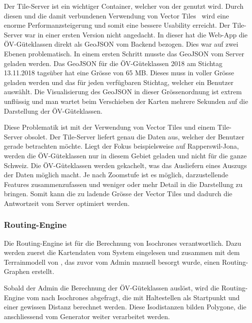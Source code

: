 Der Tile-Server ist ein wichtiger Container, welcher von der  genutzt wird.
Durch diesen und die damit verbundenen Verwendung von Vector Tiles~\cite{geometalab_vectortiles} wird eine enorme Performanzsteigerung und somit eine bessere Usability erreicht.
Der Tile-Server war in einer ersten Version nicht angedacht.
In dieser hat die Web-App die \acs{ÖV}-Güteklassen direkt als GeoJSON vom Backend bezogen.
Dies war auf zwei Ebenen problematisch.
In einem ersten Schritt musste das GeoJSON vom Server geladen werden.
Das GeoJSON für die \acs{ÖV}-Güteklassen 2018 am Stichtag 13.11.2018 tagsüber hat eine Grösse von 65 MB.
Dieses muss in voller Grösse geladen werden und das für jeden verfügbaren Stichtag, welcher ein Benutzer auswählt.
Die Visualisierung des GeoJSON in dieser Grössenordnung ist extrem unflüssig und man wartet beim Verschieben der Karten mehrere Sekunden auf die Darstellung der \acs{ÖV}-Güteklassen.

Diese Problematik ist mit der Verwendung von Vector Tiles und einem Tile-Server obsolet.
Der Tile-Server liefert genau die Daten aus, welcher der Benutzer gerade betrachten möchte.
Liegt der Fokus beispielsweise auf Rapperswil-Jona, werden die \acs{ÖV}-Güteklassen nur in diesem Gebiet geladen und nicht für die ganze Schweiz.
Die \acs{ÖV}-Güteklassen werden gekachelt, was das Ausliefern eines Auszugs der Daten möglich macht.
Je nach Zoomstufe ist es möglich, darzustellende Features zusammenzufassen und weniger oder mehr Detail in die Darstellung zu bringen. Somit kann die zu ladende Grösse der Vector Tiles und dadurch die Antwortzeit vom Server optimiert werden.

\subsubsection{Routing-Engine}
\label{container:Routing-Engine}

Die Routing-Engine ist für die Berechnung von \glspl{Isochrone} verantwortlich.
Dazu werden zuerst die Kartendaten vom System  eingelesen und zusammen mit dem \gls{Terrainmodell} von , das zuvor vom Admin manuell besorgt wurde, einen Routing-Graphen erstellt.

Sobald der Admin die Berechnung der ÖV-Güteklassen auslöst, wird die Routing-Engine vom  nach \glspl{Isochrone} abgefragt, die mit Haltestellen als Startpunkt und einer gewissen Distanz berechnet werden.
Diese Isodistanzen bilden Polygone, die anschliessend vom Generator weiter verarbeitet werden.
